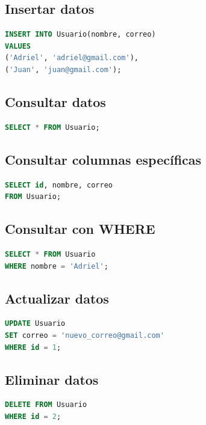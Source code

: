 \documentclass[12pt]{article}
\begin{document}
\subsection{Insertar datos}

\begin{lstlisting}[language=SQL]
INSERT INTO Usuario(nombre, correo)
VALUES
('Adriel', 'adriel@gmail.com'),
('Juan', 'juan@gmail.com');
\end{lstlisting}

\subsection{Consultar datos}

\begin{lstlisting}[language=SQL]
SELECT * FROM Usuario;
\end{lstlisting}

\subsection{Consultar columnas específicas}

\begin{lstlisting}[language=SQL]
SELECT id, nombre, correo
FROM Usuario;
\end{lstlisting}

\subsection{Consultar con WHERE}

\begin{lstlisting}[language=SQL]
SELECT * FROM Usuario
WHERE nombre = 'Adriel';
\end{lstlisting}

\subsection{Actualizar datos}

\begin{lstlisting}[language=SQL]
UPDATE Usuario
SET correo = 'nuevo_correo@gmail.com'
WHERE id = 1;
\end{lstlisting}

\subsection{Eliminar datos}

\begin{lstlisting}[language=SQL]
DELETE FROM Usuario
WHERE id = 2;
\end{lstlisting}
\end{document}
